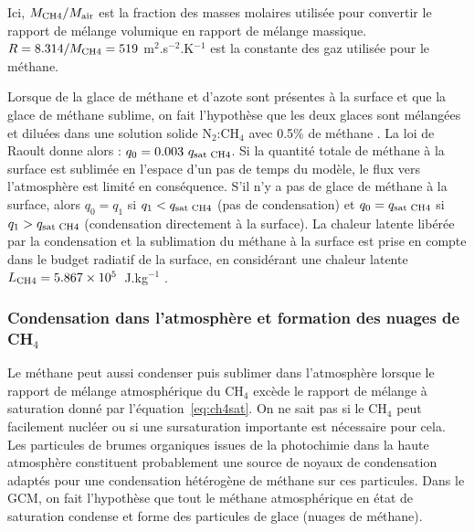 Ici, ${M_{\mbox{\scriptsize CH4}}}/{M_{\mbox{\scriptsize air}}}$ est la fraction des masses molaires utilisée pour convertir le rapport de mélange volumique en rapport de mélange massique. $R = 8.314/M_{\mbox{\scriptsize CH4}} = 519~$m$^2$.s$^{-2}$.K$^{-1}$ est la constante des gaz utilisée pour le méthane. 

Lorsque de la glace de méthane et d’azote sont présentes à la surface et que la glace de méthane sublime, on fait l’hypothèse que les deux glaces sont mélangées et diluées dans une solution solide N$_2$:CH$_4$ avec 0.5\% de méthane \citep{Merl:15}. La loi de Raoult donne alors :  
$q_0= 0.003~q_{\mbox{\scriptsize  sat CH4}}$.
Si la quantité totale de méthane à la surface est sublimée en l’espace d’un pas de temps du modèle, le flux vers l’atmosphère est limité en conséquence. 
S’il n’y a pas de glace de méthane à la surface, alors $q_0= q_1$ si $q_1 < q_{\mbox{\scriptsize sat CH4}}$ (pas de condensation) et $q_0 = q_{\mbox{\scriptsize sat CH4}}$ si $q_1 > q_{\mbox{\scriptsize sat CH4}}$ (condensation directement à la surface).
La chaleur latente libérée par la condensation et la sublimation du méthane à la surface est prise en compte dans le budget radiatif de la surface, en considérant une chaleur latente $L_{\mbox{\scriptsize CH4}} = 5.867 \times 10^5$~J.kg$^{-1}$ \citep{FraySchm:09}.

\subsubsection{Condensation dans l’atmosphère et formation des nuages de CH$_4$}
\label{sc:paramnuage}

Le méthane peut aussi condenser puis sublimer dans l’atmosphère lorsque le rapport de mélange atmosphérique du CH$_4$ excède le rapport de mélange à saturation donné par l’équation~\ref{eq:ch4sat}. On ne sait pas si le CH$_4$ peut facilement nucléer ou si une sursaturation importante est nécessaire pour cela. Les particules de brumes organiques issues de la photochimie dans la haute atmosphère constituent probablement une source de noyaux de condensation adaptés pour une condensation hétérogène de méthane sur ces particules. Dans le GCM, on fait l’hypothèse que tout le méthane atmosphérique en état de saturation condense et forme des particules de glace (nuages de méthane). 

